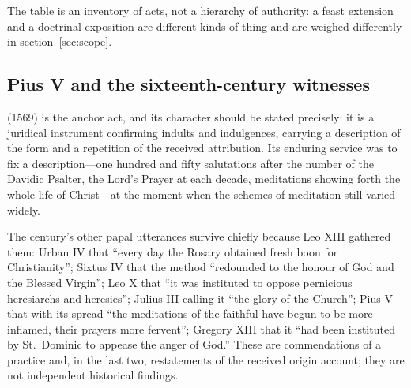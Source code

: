 \noindent The table is an inventory of acts, not a hierarchy of
authority: a feast extension and a doctrinal exposition are different
kinds of thing and are weighed differently in
section~\ref{sec:scope}.

\subsection{Pius V and the sixteenth-century witnesses}

 (1569) is the anchor act, and its
character should be stated precisely: it is a juridical instrument
confirming indults and indulgences, carrying a description of the form
and a repetition of the received attribution. Its enduring service was
to fix a description---one hundred and fifty salutations after the
number of the Davidic Psalter, the Lord's Prayer at each decade,
meditations showing forth the whole life of Christ---at the moment when
the schemes of meditation still varied widely.

The century's other papal utterances survive chiefly because Leo XIII
gathered them: Urban IV that ``every day the Rosary obtained fresh boon
for Christianity''; Sixtus IV that the method ``redounded to the honour
of God and the Blessed Virgin''; Leo X that ``it was instituted to
oppose pernicious heresiarchs and heresies''; Julius III calling it
``the glory of the Church''; Pius V that with its spread ``the
meditations of the faithful have begun to be more inflamed, their
prayers more fervent''; Gregory XIII that it ``had been instituted by
St.~Dominic to appease the anger of God.'' These are commendations of a
practice and, in the last two, restatements of the received origin
account; they are not independent historical findings.


